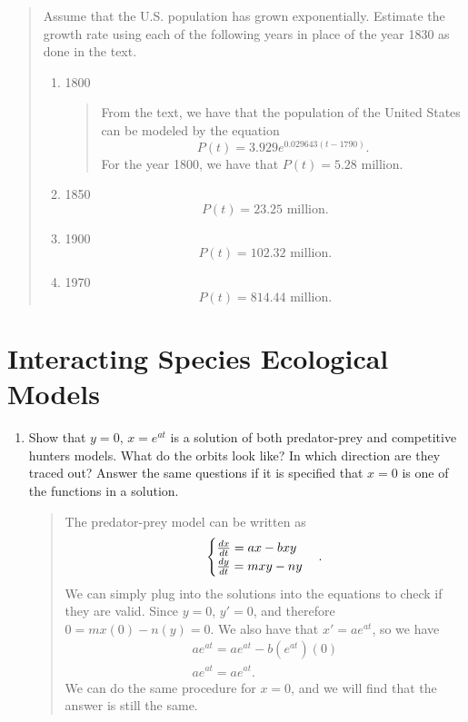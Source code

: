 \documentclass{hw}
\begin{document}
\begin{enumerate}
\begin{quote}
\item Assume that the U.S. population has grown exponentially. Estimate the growth rate using
each of the following years in place of the year 1830 as done in the text.
\begin{enumerate}
\item 1800
\begin{quote}
From the text, we have that the population of the United States can be modeled by the equation
\[
P(t) = 3.929e^{0.029643(t - 1790)}.
\]
For the year 1800, we have that $P(t) = 5.28$ million.
\end{quote}
\item 1850
\[
P(t) = 23.25\text{ million}.
\]
\item 1900
\[
P(t) = 102.32\text{ million}.
\]
\item 1970
\[
P(t) = 814.44\text{ million}.
\]
\end{enumerate}
\end{quote}
\end{enumerate}

\newpage
\section{Interacting Species Ecological Models}
\begin{enumerate}
\item Show that $y=0$, $x =e^{at}$ is a solution of both predator-prey and competitive hunters models. What
do the orbits look like? In which direction are they traced out? Answer the same questions if it is
specified that $x = 0$ is one of the functions in a solution.
\begin{quote}
The predator-prey model can be written as
\[
\begin{cases}
{dx\over dt} = ax-bxy\\
{dy\over dt} = mxy - ny
\end{cases}.
\]
We can simply plug into the solutions into the equations to check if they are valid. Since $y=0$,
$y'=0$, and therefore $0=mx(0)-n(y) = 0$. We also have that $x'=ae^{at}$, so we have
\begin{gather*}
ae^{at} = ae^{at} - b(e^{at})(0)\\
ae^{at} = ae^{at}.
\end{gather*}
We can do the same procedure for $x=0$, and we will find that the answer is still the same.
\end{quote}
\end{enumerate}

\end{document}
